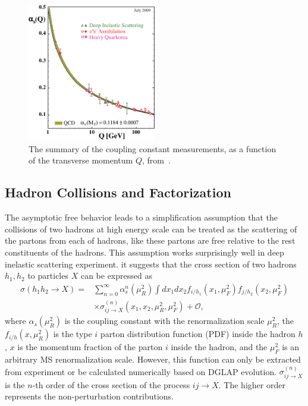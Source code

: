 \begin{figure}[ht]
  \begin{center}
    \includegraphics[width=0.5\textwidth]{figures/introduction/runing_alphas.eps}
  \end{center}
  \caption{The summary of the coupling constant measurements, as a function of the transverse momentum $Q$, from~\cite{Bethke:2012zza}.}
  \label{fig:alphas}
\end{figure}

\subsection{Hadron Collisions and Factorization}
The asymptotic free behavior leads to a simplification assumption that the collisions of two hadrons at high energy scale can be treated as the scattering of the partons from each of hadrons, like these partons are free relative to the rest constituents of the hadrons. This assumption works surprisingly well in deep inelastic scattering experiment. it suggests that the cross section of two hadrons $h_1,h_2$ to particles $X$ can be expressed as 
\begin{equation}
\begin{aligned}
\sigma(h_1h_2\to X)=&\sum_{n=0}^\infty\alpha_s^n(\mu_R^2)\int dx_1dx_2f_{i/h_1}(x_1,\mu^2_F)f_{j/h_2}(x_2,\mu^2_F)\\
&\times\sigma^{(n)}_{ij\to X}(x_1,x_2,\mu^2_R, \mu^2_F)+\mathcal{O},
\end{aligned}\label{eq:factorization}
\end{equation}
where $\alpha_s(\mu^2_R)$ is the coupling constant with the renormalization scale $\mu^2_R$, the $f_{i/h}(x,\mu^2_R)$ is the type $i$ parton distribution function (PDF) inside the hadron $h$, $x$ is the momentum fraction of the parton $i$ inside the hadron, and the $\mu^2_F$ is an arbitrary MS renormalization scale. However, this function can only be extracted from experiment or be calculated numerically based on DGLAP evolution.  $\sigma^{(n)}_{ij\to X}$ is the $n$-th order of the cross section of the process $ij\to X$.  The higher order represents the non-perturbation contributions.

